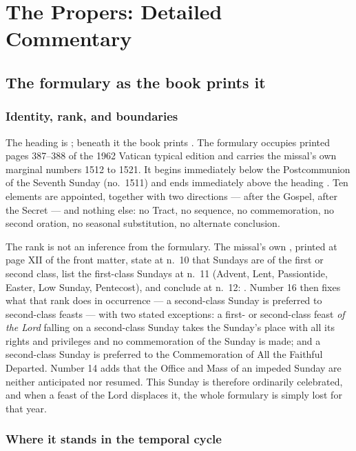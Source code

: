 \section{The Propers: Detailed Commentary}

\subsection{The formulary as the book prints it}

\subsubsection*{Identity, rank, and boundaries}

The heading is ; beneath it the book
prints . The formulary occupies printed pages 387--388 of
the 1962 Vatican typical edition and carries the missal's own marginal
numbers 1512 to 1521. It begins immediately below the Postcommunion of the
Seventh Sunday (no.\ 1511) and ends immediately above the heading
. Ten elements are appointed, together
with two directions ---  after the Gospel,  after the Secret --- and nothing else: no Tract, no sequence,
no commemoration, no second oration, no seasonal substitution, no alternate
conclusion.

The rank is not an inference from the formulary. The missal's own
, printed at page XII of the front matter, state at
n.\ 10 that Sundays are of the first or second class, list the first-class
Sundays at n.\ 11 (Advent, Lent, Passiontide, Easter, Low Sunday, Pentecost),
and conclude at n.\ 12: . Number 16
then fixes what that rank does in occurrence --- a second-class Sunday is
preferred to second-class feasts --- with two stated exceptions: a first- or
second-class feast \emph{of the Lord} falling on a second-class Sunday takes
the Sunday's place with all its rights and privileges and no commemoration of
the Sunday is made; and a second-class Sunday is preferred to the
Commemoration of All the Faithful Departed. Number 14 adds that the Office and
Mass of an impeded Sunday are neither anticipated nor resumed. This Sunday is
therefore ordinarily celebrated, and when a feast of the Lord displaces it, the
whole formulary is simply lost for that year.

\subsubsection*{Where it stands in the temporal cycle}

